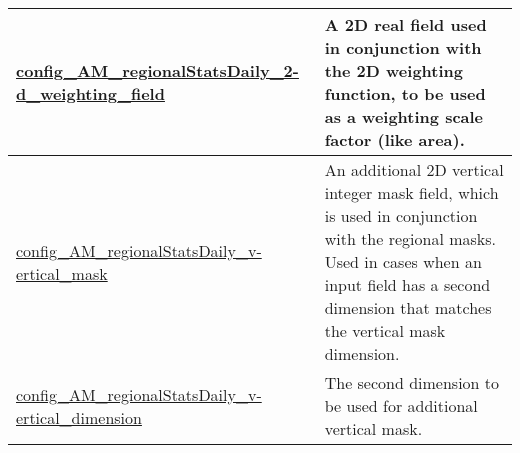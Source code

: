 {\begin{center}
\begin{longtable}{| p{2.0in} || p{4.0in} |}
    \hline
    \hyperref[subsec:nm_sec_config_AM_regionalStatsDaily_2d_weighting_field]{config\_AM\_regionalStatsDaily\_2-}\hyperref[subsec:nm_sec_config_AM_regionalStatsDaily_2d_weighting_field]{d\_weighting\_field}& A 2D real field used in conjunction with the 2D weighting function, to be used as a weighting scale factor (like area). \\
    \hline
    \hyperref[subsec:nm_sec_config_AM_regionalStatsDaily_vertical_mask]{config\_AM\_regionalStatsDaily\_v-}\hyperref[subsec:nm_sec_config_AM_regionalStatsDaily_vertical_mask]{ertical\_mask}& An additional 2D vertical integer mask field, which is used in conjunction with the regional masks. Used in cases when an input field has a second dimension that matches the vertical mask dimension. \\
    \hline
    \hyperref[subsec:nm_sec_config_AM_regionalStatsDaily_vertical_dimension]{config\_AM\_regionalStatsDaily\_v-}\hyperref[subsec:nm_sec_config_AM_regionalStatsDaily_vertical_dimension]{ertical\_dimension}& The second dimension to be used for additional vertical mask. \\
    \hline
\end{longtable}
\end{center}
}
